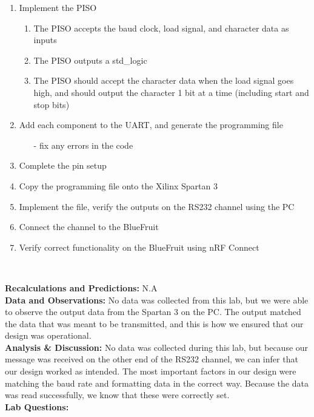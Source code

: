 \documentclass{article}
\newcommand{\sect}[1]{\noindent\textbf{#1}}
\begin{document}
\begin{enumerate}
	\item Implement the PISO
	\begin{enumerate}
		\item The PISO accepts the baud clock, load signal, and character data as inputs
		\item The PISO outputs a std\_logic
		\item The PISO should accept the character data when the load signal goes high, and should output the character 1 bit at a time (including start and stop bits)
	\end{enumerate}
	\item Add each component to the UART, and generate the programming file
	\begin{itemize}[nolistsep, noitemsep]
		\item[-] fix any errors in the code 
	\end{itemize}
	\item Complete the pin setup
	\item Copy the programming file onto the Xilinx Spartan 3
	\item Implement the file, verify the outputs on the RS232 channel using the PC
	\item Connect the channel to the BlueFruit
	\item Verify correct functionality on the BlueFruit using nRF Connect
\end{enumerate}~

\sect{Recalculations and Predictions:} N.A\\

\sect{Data and Observations:} No data was collected from this lab, but we were able to observe the output data from the Spartan 3 on the PC. The output matched the data that was meant to be transmitted, and this is how we ensured that our design was operational.\\

\sect{Analysis \& Discussion:} No data was collected during this lab, but because our message was received on the other end of the RS232 channel, we can infer that our design worked as intended. The most important factors in our design were matching the baud rate and formatting data in the correct way. Because the data was read successfully, we know that these were correctly set.\\

\sect{Lab Questions:}
\end{document}
